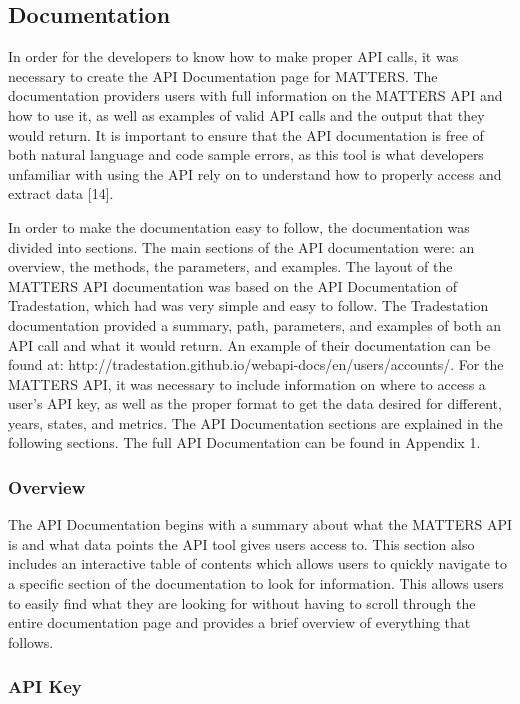 			\subsection{Documentation}
			
			In order for the developers to know how to make proper API calls, it was necessary to create the API Documentation page for MATTERS. The documentation providers users with full information on the MATTERS API and how to use it, as well as examples of valid API calls and the output that they would return. It is important to ensure that the API documentation is free of both natural language and code sample errors, as this tool is what developers unfamiliar with using the API rely on to understand how to properly access and extract data [14]. 
			
			In order to make the documentation easy to follow, the documentation was divided into sections. The main sections of the API documentation were: an overview, the methods, the parameters, and examples. The layout of the MATTERS API documentation was based on the API Documentation of Tradestation, which had was very simple and easy to follow. The Tradestation documentation provided a summary, path, parameters, and examples of both an API call and what it would return. An example of their documentation can be found at: http://tradestation.github.io/webapi-docs/en/users/accounts/. For the MATTERS API, it was necessary to include information on where to access a user’s API key, as well as the proper format to get the data desired for different, years, states, and metrics. The API Documentation sections are explained in the following sections. The full API Documentation can be found in Appendix 1.
			
			
			\subsubsection{Overview}
			
			The API Documentation begins with a summary about what the MATTERS API is and what data points the API tool gives users access to. This section also includes an interactive table of contents which allows users to quickly navigate to a specific section of the documentation to look for information. This allows users to easily find what they are looking for without having to scroll through the entire documentation page and provides a brief overview of everything that follows.
			
			\subsubsection{API Key}
			
